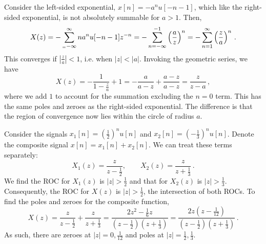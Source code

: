%
\begin{exmp}
  Consider the left-sided exponential, $x[n] = -a^n u[-n-1]$, which like
  the right-sided exponential, is not absolutely summable for $a>1$. Then,
  \begin{displaymath}
    X(z) = -\sum_{_=-\infty}^\infty{n}a^n u[-n-1]z^{-n}
    = -\sum_{n=-\infty}^{-1}\left(\frac{a}{z}\right)^n
    = -\sum_{n=1}^{\infty}\left(\frac{z}{a}\right)^n \,.
  \end{displaymath}
  This converges if $\left|\frac{z}{a}\right| < 1$, i.e. when $|z| < |a|$.
  Invoking the geometric series, we have
  \begin{displaymath}
    X(z) = -\frac{1}{1 - \frac{z}{a}} + 1 = -\frac{a}{a - z} + \frac{a-z}{a - z}
    = \frac{z}{z-a} \,,
  \end{displaymath}
  where we add $1$ to account for the summation excluding the $n=0$ term. This
  has the same poles and zeroes as the right-sided exponential. The difference is
  that the region of convergence now lies within the circle of radius $a$.
\end{exmp}
%
\begin{exmp}
  Consider the signals $x_1[n] = \left(\frac{1}{2}\right)^nu[n]$ and
  $x_2[n] = \left(-\frac{1}{3}\right)^n u[n]$. Denote the composite signal
  $x[n] = x_1[n] + x_2[n]$. We can treat these terms separately:
  \begin{displaymath}
    X_1(z) = \frac{z}{z - \frac{1}{2}}, \qquad X_2(z) = \frac{z}{z + \frac{1}{3}} \,.
  \end{displaymath}
  We find the ROC for $X_1(z)$ is $|z|>\frac{1}{2}$ and that for $X_2(z)$ is
  $|z| > \frac{1}{3}$. Consequently, the ROC for $X(z)$ is $|z| > \frac{1}{2}$,
  the intersection of both ROCs. To find the poles and zeroes for the composite
  function,
  \begin{displaymath}
    X(z) = \frac{z}{z - \frac{1}{2}} + \frac{z}{z + \frac{1}{3}}
    = \frac{2z^2 - \frac{1}{6}z}{(z-\frac{1}{2})(z+\frac{1}{3})}
    = \frac{2z(z-\frac{1}{12})}{(z-\frac{1}{2})(z+\frac{1}{3})} \,.
  \end{displaymath}
  As such, there are zeroes at $|z|=0,\frac{1}{12}$ and poles at
  $|z|=\frac{1}{2},\frac{1}{3}$.
\end{exmp}
%
